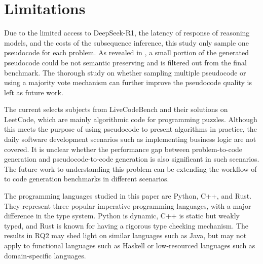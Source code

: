 \section{Limitations}
Due to the limited access to DeepSeek-R1, the latency of response of reasoning models, and the costs of the subsequence inference, this study only sample one pseudocode for each problem.
As revealed in , a small portion of the generated pseudocode could be not semantic preserving and is filtered out from the final benchmark.
The thorough study on whether sampling multiple pseudocode or using a majority vote mechanism can further improve the pseudocode quality is left as future work.


The current \name selects subjects from LiveCodeBench and their solutions on LeetCode, which are mainly algorithmic code for programming puzzles.
Although this meets the purpose of using pseudocode to present algorithms in practice, the daily software development scenarios such as implementing business logic are not covered.
It is unclear whether the performance gap between problem-to-code generation and pseudocode-to-code generation is also significant in such scenarios.
The future work to understanding this problem can be extending the workflow of \name to code generation benchmarks in different scenarios.

The programming languages studied in this paper are Python, C++, and Rust.
They represent three popular imperative programming languages, with a major difference in the type system.
Python is dynamic, C++ is static but weakly typed, and Rust is known for having a rigorous type checking mechanism. 
The results in RQ2 may shed light on similar languages such as Java, but may not apply to functional languages such as Haskell or low-resourced languages such as domain-specific languages.

\newpage



